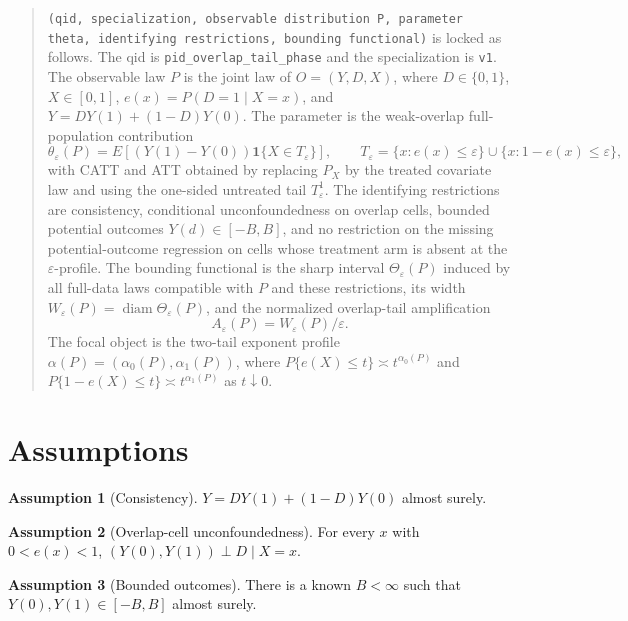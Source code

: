 \documentclass[11pt]{article}
\theoremstyle{definition}
\newtheorem{assumption}{Assumption}
\theoremstyle{plain}
\theoremstyle{remark}
\begin{document}
\begin{quote}\small
\texttt{(qid, specialization, observable distribution P, parameter theta, identifying restrictions, bounding functional)}
is locked as follows. The qid is \texttt{pid\_overlap\_tail\_phase} and the specialization is
\texttt{v1}. The observable law \(P\) is the joint law of \(O=(Y,D,X)\), where
\(D\in\{0,1\}\), \(X\in[0,1]\), \(e(x)=P(D=1\mid X=x)\), and \(Y=D Y(1)+(1-D)Y(0)\).
The parameter is the weak-overlap full-population contribution
\[
\theta_\varepsilon(P)=E[(Y(1)-Y(0))\mathbf 1\{X\in T_\varepsilon\}],\qquad
T_\varepsilon=\{x:e(x)\leq \varepsilon\}\cup\{x:1-e(x)\leq \varepsilon\},
\]
with CATT and ATT obtained by replacing \(P_X\) by the treated covariate law and using
the one-sided untreated tail \(T_\varepsilon^1\). The identifying restrictions are consistency, conditional
unconfoundedness on overlap cells, bounded potential outcomes \(Y(d)\in[-B,B]\), and no
restriction on the missing potential-outcome regression on cells whose treatment arm is
absent at the \(\varepsilon\)-profile. The bounding functional is the sharp interval
\(\Theta_\varepsilon(P)\) induced by all full-data laws compatible with \(P\) and these
restrictions, its width \(W_\varepsilon(P)=\operatorname{diam}\Theta_\varepsilon(P)\), and
the normalized overlap-tail amplification
\[
A_\varepsilon(P)=W_\varepsilon(P)/\varepsilon .
\]
The focal object is the two-tail exponent profile
\(\alpha(P)=(\alpha_0(P),\alpha_1(P))\), where
\(P\{e(X)\leq t\}\asymp t^{\alpha_0(P)}\) and
\(P\{1-e(X)\leq t\}\asymp t^{\alpha_1(P)}\) as \(t\downarrow0\).
\end{quote}

\section{Assumptions}
\begin{assumption}[Consistency]\label{ass:consistency}
\(Y=D Y(1)+(1-D)Y(0)\) almost surely.
\end{assumption}

\begin{assumption}[Overlap-cell unconfoundedness]\label{ass:unconf}
For every \(x\) with \(0<e(x)<1\), \((Y(0),Y(1))\perp D\mid X=x\).
\end{assumption}

\begin{assumption}[Bounded outcomes]\label{ass:bounded}
There is a known \(B<\infty\) such that \(Y(0),Y(1)\in[-B,B]\) almost surely.
\end{assumption}
\end{document}
